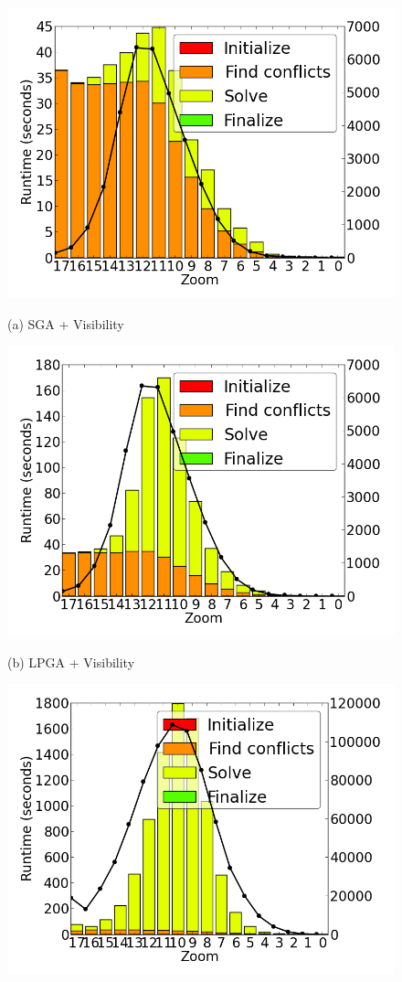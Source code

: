 \begin{figure}[tb]
  \begin{minipage}{0.329\linewidth}
    \centerline{\includegraphics[width=0.9\linewidth]{./figs/prelim_pnt_500k_tourism_heuristic_A.png}}
    \centerline{(a) SGA + Visibility}
  \end{minipage} \hfill
  \begin{minipage}{0.329\linewidth}
    \centerline{\includegraphics[width=0.9\linewidth]{./figs/prelim_pnt_500k_tourism_lp_A.png}}
    \centerline{(b) LPGA + Visibility}
  \end{minipage} \hfill
  \begin{minipage}{0.329\linewidth}
    \centerline{\includegraphics[width=0.9\linewidth]{./figs/prelim_pnt_500k_tourism_lp_B.png}}

\end{minipage}
\end{figure}

